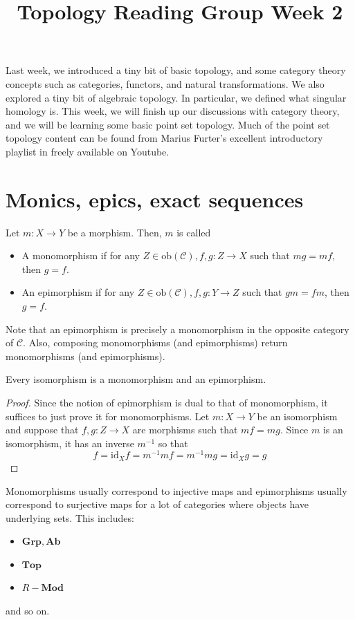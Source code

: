 \documentclass[12pt,reqno]{amsart}
\numberwithin{theorem}{section}
\theoremstyle{definition}
\theoremstyle{remark}
\numberwithin{equation}{section}
\newcommand{\cC}{\mathcal{C}}
\theoremstyle{definition}
\newcommand{\ob}{\mathrm{ob}}
\newcommand{\id}{\mathrm{id}}
\begin{document}
\title{Topology Reading Group Week 2}
\maketitle
Last week, we introduced a tiny bit of basic topology, and some category theory concepts such as categories, functors, and natural transformations. We also explored a tiny bit of algebraic topology. In particular, we defined what singular homology is. This week, we will finish up our discussions with category theory, and we will be learning some basic point set topology. Much of the point set topology content can be found from Marius Furter's excellent introductory playlist in \cite{Furter} freely available on Youtube. 
\section{Monics, epics, exact sequences}
\begin{definition}
    Let $m:X\rightarrow Y $ be a morphism. Then, $m$ is called
    \begin{itemize}
        \item A monomorphism if for any $Z \in \ob(\cC), f,g:Z\rightarrow X$ such that $mg=mf$, then $g=f$.
        \item An epimorphism if for any $Z \in \ob(\cC), f,g:Y\rightarrow Z$ such that $gm=fm$, then $g=f$.
    \end{itemize}
\end{definition}
Note that an epimorphism is precisely a monomorphism in the opposite category of $\cC$. Also, composing monomorphisms (and epimorphisms) return monomorphisms (and epimorphisms).
\begin{proposition}
    Every isomorphism is a monomorphism and an epimorphism.
\end{proposition}
\begin{proof}
    Since the notion of epimorphism is dual to that of monomorphism, it suffices to just prove it for monomorphisms. Let $m:X\rightarrow Y$ be an isomorphism and suppose that $f, g :Z\rightarrow X$ are morphisms such that $mf = mg$. Since $m$ is an isomorphism, it has an inverse $m^{-1}$ so that $$f=\id_Xf=m^{-1}mf=m^{-1}mg =\id_Xg=g$$
\end{proof}
\begin{example}
    Monomorphisms usually correspond to injective maps and epimorphisms usually correspond to surjective maps for a lot of categories where objects have underlying sets. This includes:
    \begin{itemize}
        \item $\mathbf{Grp},\mathbf{Ab}$
        \item $\mathbf{Top}$
        \item $R-\mathbf{Mod}$
    \end{itemize}
    and so on.
\end{example}
\end{document}
